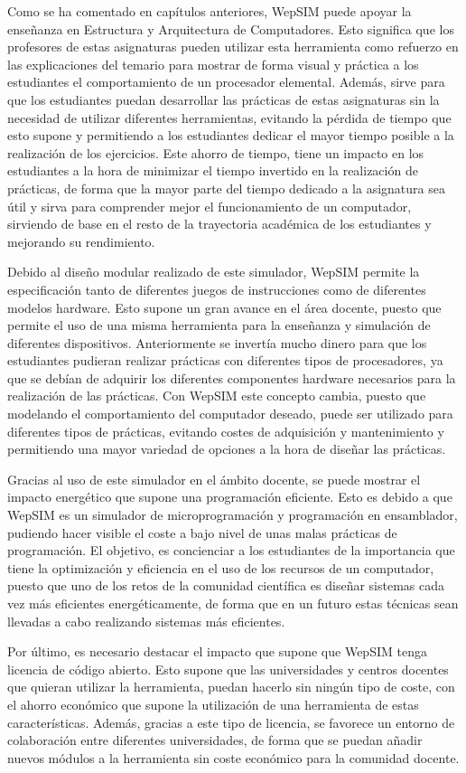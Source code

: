 Como se ha comentado en capítulos anteriores, WepSIM puede apoyar la enseñanza en Estructura y Arquitectura de Computadores. Esto significa que los profesores de estas asignaturas pueden utilizar esta herramienta como refuerzo en las explicaciones del temario para mostrar de forma visual y práctica a los estudiantes el comportamiento de un procesador elemental. Además, sirve para que los estudiantes puedan desarrollar las prácticas de estas asignaturas sin la necesidad de utilizar diferentes herramientas, evitando la pérdida de tiempo que esto supone y permitiendo a los estudiantes dedicar el mayor tiempo posible a la realización de los ejercicios. Este ahorro de tiempo, tiene un impacto en los estudiantes a la hora de minimizar el tiempo invertido en la realización de prácticas, de forma que la mayor parte del tiempo dedicado a la asignatura sea útil y sirva para comprender mejor el funcionamiento de un computador, sirviendo de base en el resto de la trayectoria académica de los estudiantes y mejorando su rendimiento.

Debido al diseño modular realizado de este simulador, WepSIM permite la especificación tanto de diferentes juegos de instrucciones como de diferentes modelos hardware. Esto supone un gran avance  en el área docente, puesto que permite el uso de una misma herramienta para la enseñanza y simulación de diferentes dispositivos. Anteriormente se invertía mucho dinero para que los estudiantes pudieran realizar prácticas con diferentes tipos de procesadores, ya que se debían de adquirir los diferentes componentes hardware necesarios para la realización de las prácticas. Con WepSIM este concepto cambia, puesto que modelando el comportamiento del computador deseado, puede ser utilizado para diferentes tipos de prácticas, evitando costes de adquisición y mantenimiento y permitiendo una mayor variedad de opciones a la hora de diseñar las prácticas.

Gracias al uso de este simulador en el ámbito docente, se puede mostrar el impacto energético que supone una programación eficiente. Esto es debido a que WepSIM es un simulador de microprogramación y programación en ensamblador, pudiendo hacer visible el coste a bajo nivel de unas malas prácticas de programación. El objetivo, es concienciar a los estudiantes de la importancia que tiene la optimización y eficiencia en el uso de los recursos de un computador, puesto que uno de los retos de la comunidad científica es diseñar sistemas cada vez más eficientes energéticamente, de forma que en un futuro estas técnicas sean llevadas a cabo realizando sistemas más eficientes.

Por último, es necesario destacar el impacto que supone que WepSIM tenga licencia de código abierto. Esto supone que las universidades y centros docentes que quieran utilizar la herramienta, puedan hacerlo sin ningún tipo de coste, con el ahorro económico que supone la utilización de una herramienta de estas características. Además, gracias a este tipo de licencia, se favorece un entorno de colaboración entre diferentes universidades, de forma que se puedan añadir nuevos módulos a la herramienta sin coste económico para la comunidad docente.
